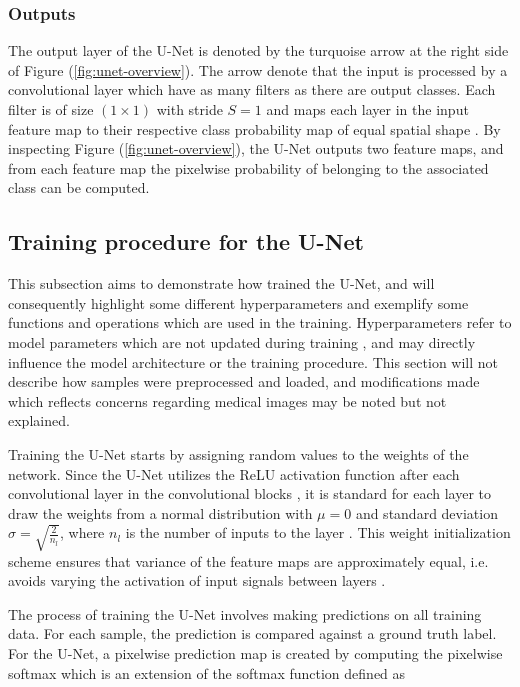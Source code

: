 \documentclass[../main/thesis.tex]{subfiles}
\begin{document}
\subsubsection{Outputs}
The output layer of the U-Net is denoted by the turquoise arrow at the right side of Figure (\ref{fig:unet-overview}). The arrow denote that the input is processed by a convolutional layer which have as many filters as there are output classes. Each filter is of size $(1 \times 1)$ with stride $S=1$ and maps each layer in the input feature map to their respective class probability map of equal spatial shape \citep{Ronneberger2015}. By inspecting Figure (\ref{fig:unet-overview}), the U-Net outputs two feature maps, and from each feature map the pixelwise probability of belonging to the associated class can be computed.

\subsection{Training procedure for the U-Net}
\label{sec:training-loop}
This subsection aims to demonstrate how \citet{Ronneberger2015} trained the U-Net, and will consequently highlight some different hyperparameters and exemplify some functions and operations which are used in the training. Hyperparameters refer to model parameters which are not updated during training \citep{Yu2020a}, and may directly influence the model architecture or the training procedure. This section will not describe how samples were preprocessed and loaded, and modifications made which reflects concerns regarding medical images may be noted but not explained.

Training the U-Net starts by assigning random values to the weights of the network. Since the U-Net utilizes the ReLU activation function after each convolutional layer in the convolutional blocks \citep{Ronneberger2015}, it is standard for each layer to draw the weights from a normal distribution with $\mu = 0$ and standard deviation $\sigma = \sqrt{\frac{2}{n_l}}$, where $n_l$ is the number of inputs to the layer \citet{He2015}. This weight initialization scheme ensures that variance of the feature maps are approximately equal, i.e. avoids varying the activation of input signals between layers \citet{He2015,Ronneberger2015}.

The process of training the U-Net involves making predictions on all training data. For each sample, the prediction is compared against a ground truth label. For the U-Net, a pixelwise prediction map is created by computing the pixelwise softmax which is an extension of the softmax function \citep{Bridle1990} defined as 
\end{document}

